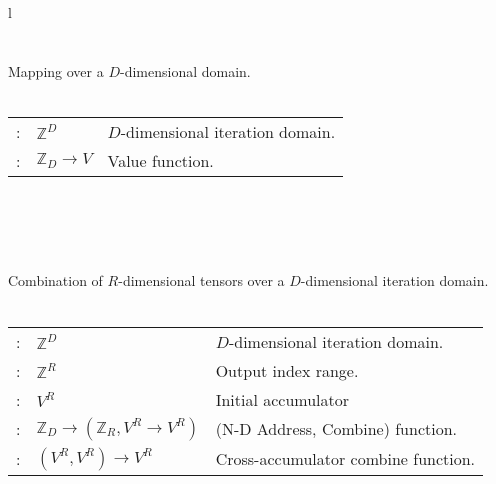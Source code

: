 \begin{figure*}
\fontsize{9}{10}
\selectfont
\begin{tabular}{l}
 \\ \midrule
{} \\
\vspace{-7pt} \\
Mapping over a $D$-dimensional domain. \\
\vspace{-8pt} \\
{
\begin{tabular}{lll}
\argg{d}: &\hspace{-10pt} $\mathbb{Z}^D$  & \hspace{-4pt}$D$-dimensional iteration domain. \\
\argg{m}: &\hspace{-10pt} $\mathbb{Z}_D\rightarrow V$ & \hspace{-4pt}Value function.   \\
\end{tabular}
}
\\
\\
 \\
\vspace{-7pt} \\
Combination of $R$-dimensional tensors over a $D$-dimensional iteration domain. \\
\vspace{-8pt} \\
{
\begin{tabular}{lll}
\argg{d}: &\hspace{-10pt} $\mathbb{Z}^D$ & \hspace{-4pt}$D$-dimensional iteration domain.  \\
\argg{r}: &\hspace{-10pt} $\mathbb{Z}^R$ & \hspace{-4pt}Output index range.         \\
\argg{z}: &\hspace{-10pt} $V^R$          & \hspace{-4pt}Initial accumulator         \\
\argg{f}: &\hspace{-10pt} $\mathbb{Z}_D \rightarrow (\mathbb{Z}_R, V^R \rightarrow V^R)$ & \hspace{-4pt}(N-D Address, Combine) function.    \\
\argg{c}: &\hspace{-10pt} $(V^R, V^R) \rightarrow V^R$& \hspace{-4pt}Cross-accumulator combine function.  \\

\end{tabular}}
\end{tabular}
\end{figure*}
